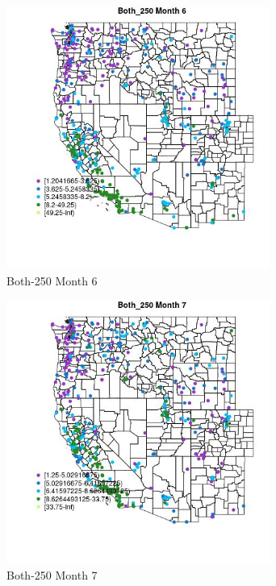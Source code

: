 \begin{figure} 
\centering  
\includegraphics[width=0.77\textwidth]{Code_Outputs/ML_input_report_ML_input_PM25_Step5_part_d_de_duplicated_aves_ML_input_MapObsMo6Both_250.jpg} 
\caption{\label{fig:ML_input_report_ML_input_PM25_Step5_part_d_de_duplicated_aves_ML_inputMapObsMo6Both_250}Both-250 Month 6} 
\end{figure} 
 

\begin{figure} 
\centering  
\includegraphics[width=0.77\textwidth]{Code_Outputs/ML_input_report_ML_input_PM25_Step5_part_d_de_duplicated_aves_ML_input_MapObsMo7Both_250.jpg} 
\caption{\label{fig:ML_input_report_ML_input_PM25_Step5_part_d_de_duplicated_aves_ML_inputMapObsMo7Both_250}Both-250 Month 7} 
\end{figure} 
 

